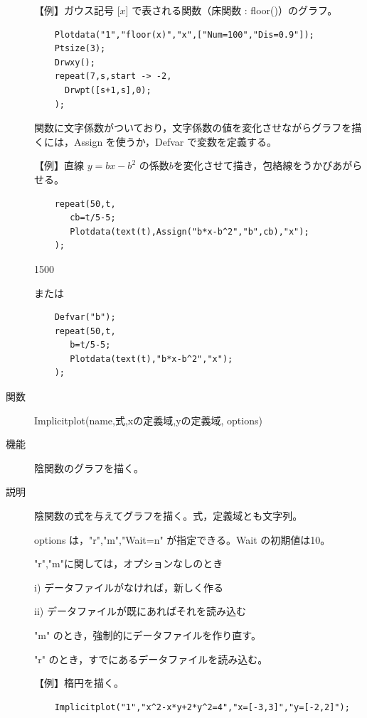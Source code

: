 \documentclass[papersize,a4paper,12pt,uplatex]{jsarticle}
\begin{document}
\begin{description}
\vspace{\baselineskip}
【例】ガウス記号 [$x$] で表される関数（床関数 : floor()）のグラフ。
\begin{verbatim}
    Plotdata("1","floor(x)","x",["Num=100","Dis=0.9"]);
    Ptsize(3);
    Drwxy();
    repeat(7,s,start -> -2,
      Drwpt([s+1,s],0);
    );
\end{verbatim}

\hspace{40mm} 

\vspace{\baselineskip}
  関数に文字係数がついており，文字係数の値を変化させながらグラフを描くには，Assign を使うか，Defvar で変数を定義する。
  
\vspace{\baselineskip}
  【例】直線 $y=bx-b^2$ の係数$b$を変化させて描き，包絡線をうかびあがらせる。
\begin{verbatim}
    repeat(50,t,
       cb=t/5-5;
       Plotdata(text(t),Assign("b*x-b^2","b",cb),"x");
    );
\end{verbatim}
\begin{layer}{150}{0}
\end{layer}

または
\begin{verbatim}
    Defvar("b");
    repeat(50,t,
       b=t/5-5;
       Plotdata(text(t),"b*x-b^2","x");
    );
\end{verbatim}

\vspace{\baselineskip}
\hypertarget{implicitplot}{}
\item[関数]  Implicitplot(name,式,xの定義域,yの定義域, options)
\item[機能]  陰関数のグラフを描く。
\item[説明]  陰関数の式を与えてグラフを描く。式，定義域とも文字列。

options は，"r","m","Wait=n" が指定できる。Wait の初期値は10。

"r","m"に関しては，オプションなしのとき

  i) データファイルがなければ，新しく作る
  
  ii) データファイルが既にあればそれを読み込む
  
"m"  のとき，強制的にデータファイルを作り直す。

"r" のとき，すでにあるデータファイルを読み込む。

\vspace{\baselineskip}
【例】楕円を描く。
\begin{verbatim}
    Implicitplot("1","x^2-x*y+2*y^2=4","x=[-3,3]","y=[-2,2]");
\end{verbatim}


\end{description}
\end{document}
